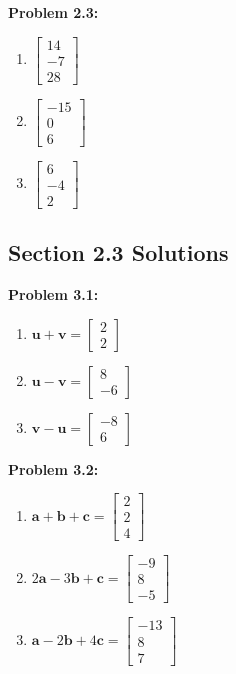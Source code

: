 \documentclass{article}
\begin{document}
\textbf{Problem 2.3:}
\begin{enumerate}
\item $\begin{bmatrix} 14 \\ -7 \\ 28 \end{bmatrix}$
\item $\begin{bmatrix} -15 \\ 0 \\ 6 \end{bmatrix}$
\item $\begin{bmatrix} 6 \\ -4 \\ 2 \end{bmatrix}$
\end{enumerate}

\subsection{Section 2.3 Solutions}

\textbf{Problem 3.1:}
\begin{enumerate}
\item $\mathbf{u} + \mathbf{v} = \begin{bmatrix} 2 \\ 2 \end{bmatrix}$
\item $\mathbf{u} - \mathbf{v} = \begin{bmatrix} 8 \\ -6 \end{bmatrix}$
\item $\mathbf{v} - \mathbf{u} = \begin{bmatrix} -8 \\ 6 \end{bmatrix}$
\end{enumerate}

\textbf{Problem 3.2:}
\begin{enumerate}
\item $\mathbf{a} + \mathbf{b} + \mathbf{c} = \begin{bmatrix} 2 \\ 2 \\ 4 \end{bmatrix}$
\item $2\mathbf{a} - 3\mathbf{b} + \mathbf{c} = \begin{bmatrix} -9 \\ 8 \\ -5 \end{bmatrix}$
\item $\mathbf{a} - 2\mathbf{b} + 4\mathbf{c} = \begin{bmatrix} -13 \\ 8 \\ 7 \end{bmatrix}$
\end{enumerate}
\end{document}
